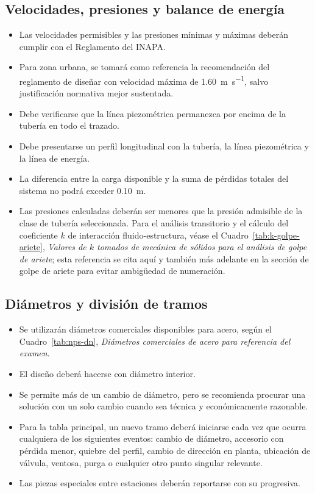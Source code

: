 \documentclass[11pt]{article}
\begin{document}
\subsection{Velocidades, presiones y balance de energía}
\begin{itemize}
\item Las velocidades permisibles y las presiones mínimas y máximas deberán cumplir con el Reglamento del INAPA.
\item Para zona urbana, se tomará como referencia la recomendación del reglamento de diseñar con velocidad máxima de \SI{1.60}{\meter\per\second}, salvo justificación normativa mejor sustentada.
\item Debe verificarse que la línea piezométrica permanezca por encima de la tubería en todo el trazado.
\item Debe presentarse un perfil longitudinal con la tubería, la línea piezométrica y la línea de energía.
\item La diferencia entre la carga disponible y la suma de pérdidas totales del sistema no podrá exceder \SI{0.10}{\meter}.
\item Las presiones calculadas deberán ser menores que la presión admisible de la clase de tubería seleccionada. Para el análisis transitorio y el cálculo del coeficiente $k$ de interacción fluido-estructura, véase el Cuadro~\ref{tab:k-golpe-ariete}, \emph{Valores de $k$ tomados de mecánica de sólidos para el análisis de golpe de ariete}; esta referencia se cita aquí y también más adelante en la sección de golpe de ariete para evitar ambigüedad de numeración.
\end{itemize}

\subsection{Diámetros y división de tramos}
\begin{itemize}
\item Se utilizarán diámetros comerciales disponibles para acero, según el Cuadro~\ref{tab:nps-dn}, \emph{Diámetros comerciales de acero para referencia del examen}.
\item El diseño deberá hacerse con diámetro interior.
\item Se permite más de un cambio de diámetro, pero se recomienda procurar una solución con un solo cambio cuando sea técnica y económicamente razonable.
\item Para la tabla principal, un nuevo tramo deberá iniciarse cada vez que ocurra cualquiera de los siguientes eventos: cambio de diámetro, accesorio con pérdida menor, quiebre del perfil, cambio de dirección en planta, ubicación de válvula, ventosa, purga o cualquier otro punto singular relevante.
\item Las piezas especiales entre estaciones deberán reportarse con su progresiva.
\end{itemize}
\end{document}
